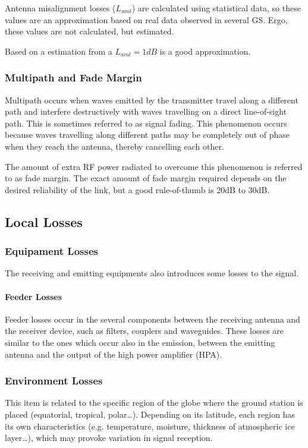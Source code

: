 Antenna misalignment losses ($L_{aml}$) are calculated using statistical data, so these values are an approximation based on real data observed in several GS. Ergo, these values are not calculated, but estimated.\cite{Jorge2012}

Based on a estimation from \cite{Macdonald2014} a $L_{aml}=1dB$ is a good approximation.

\subsubsection{Multipath and Fade Margin}
Multipath occurs when waves emitted by the transmitter travel along a different path and interfere destructively with waves travelling on a direct line-of-sight path. This is sometimes referred to as signal fading. This phenomenon occurs because waves travelling along different paths may be completely out of phase when they reach the antenna, thereby cancelling each other.

The amount of extra RF power radiated to overcome this phenomenon is referred to as fade margin. The exact
amount of fade margin required depends on the desired reliability of the link, but a good rule-of-thumb is 20dB to 30dB.

\subsection{Local Losses}
\subsubsection{Equipament Losses}
The receiving and emitting equipments also introduces some losses to the signal.

\paragraph{Feeder Losses} Feeder losses occur in the several components between the receiving antenna and the receiver device, such as filters, couplers and waveguides. These losses are similar to the ones which occur also in the emission, between the emitting antenna and the output of the high power amplifier (HPA).\cite{Jorge2012}

\subsubsection{Environment Losses}
This item is related to the specific region of the globe where the ground station is placed (equatorial, tropical, polar…). Depending on its latitude, each region has its own characteristics (e.g. temperature, moisture, thickness of atmospheric ice layer…), which may provoke variation in signal reception. \cite{Jorge2012}

